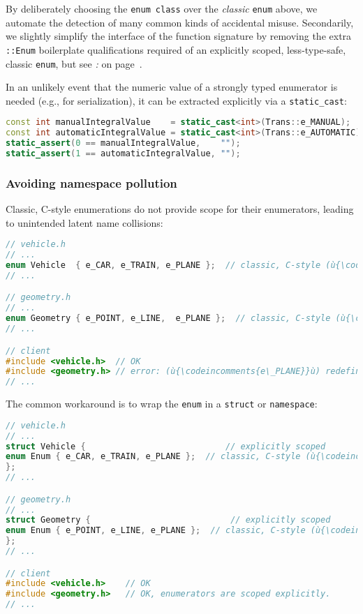 \noindent By deliberately choosing the \texttt{enum}~\texttt{class} over the
\emph{classic} \texttt{enum} above, we automate the detection of many common
kinds of accidental misuse. Secondarily, we slightly simplify the interface of the function signature by removing the extra \texttt{::Enum} boilerplate qualifications required of an explicitly
scoped, less-type-safe, classic \texttt{enum}, but see \textit{: } on page~\pageref{strong-typing-of-an-enum-class-can-be-counterproductive}.

In an unlikely event that the numeric value of a strongly typed
enumerator is needed (e.g., for serialization), it can be extracted
explicitly via a \texttt{static\_cast}:

\begin{lstlisting}[language=C++]
const int manualIntegralValue    = static_cast<int>(Trans::e_MANUAL);
const int automaticIntegralValue = static_cast<int>(Trans::e_AUTOMATIC);
static_assert(0 == manualIntegralValue,    "");
static_assert(1 == automaticIntegralValue, "");
\end{lstlisting}

\subsubsection[Avoiding namespace pollution]{Avoiding namespace pollution}\label{avoiding-namespace-pollution}

Classic, C-style enumerations do not provide scope for their
enumerators, leading to unintended latent name collisions:

\begin{lstlisting}[language=C++]
// vehicle.h
// ...
enum Vehicle  { e_CAR, e_TRAIN, e_PLANE };  // classic, C-style (ù{\codeincomments{enum}}ù)
// ...

// geometry.h
// ...
enum Geometry { e_POINT, e_LINE,  e_PLANE };  // classic, C-style (ù{\codeincomments{enum}}ù)
// ...

// client
#include <vehicle.h>  // OK
#include <geometry.h> // error: (ù{\codeincomments{e\_PLANE}}ù) redefined
// ...
\end{lstlisting}

\noindent The common workaround is to wrap the \texttt{enum} in a \texttt{struct}
or \texttt{namespace}:

\begin{lstlisting}[language=C++]
// vehicle.h
// ...
struct Vehicle {                            // explicitly scoped
enum Enum { e_CAR, e_TRAIN, e_PLANE };  // classic, C-style (ù{\codeincomments{enum}}ù)
};
// ...

// geometry.h
// ...
struct Geometry {                            // explicitly scoped
enum Enum { e_POINT, e_LINE, e_PLANE };  // classic, C-style (ù{\codeincomments{enum}}ù)
};
// ...

// client
#include <vehicle.h>    // OK
#include <geometry.h>   // OK, enumerators are scoped explicitly.
// ...
\end{lstlisting}

